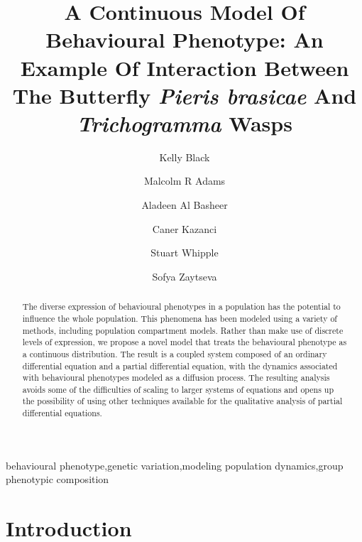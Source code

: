\documentclass[review,authoryear]{elsarticle}
\begin{document}
\begin{frontmatter}

\title{A Continuous Model Of Behavioural Phenotype: An Example Of
  Interaction Between The Butterfly \textit{Pieris brasicae} And
  \textit{Trichogramma} Wasps}

\author[math]{Kelly Black}\author[math]{Malcolm R Adams}\author[math]{Aladeen Al Basheer}\author[math,engineering]{Caner Kazanci}\author[odum]{Stuart Whipple}\author[math]{Sofya Zaytseva}

\address[math]{Department of Mathematics, University of Georgia, Athens, GA 30602, USA}
\address[engineering]{College of Engineering, University of Georgia, Athens, GA 30602, USA}
\address[odum]{Odum School of Ecology and College of Engineering, University of Georgia, Athens, GA 30602, USA}



\begin{abstract}
The diverse expression of behavioural phenotypes in a population has the potential to influence the whole population. This phenomena has been modeled using a variety of methods, including population compartment models. Rather than make use of discrete levels of expression, we propose a novel model that treats the behavioural phenotype as a continuous distribution. The result is a coupled system composed of an ordinary differential equation and a partial differential equation, with the dynamics associated with behavioural phenotypes modeled as a diffusion process. The resulting analysis avoids some of the difficulties of scaling to larger systems of equations and opens up the possibility of using  other techniques available for the qualitative analysis of partial differential equations. 

\end{abstract}

\begin{keyword}
behavioural phenotype\sep genetic variation\sep modeling population dynamics\sep group phenotypic composition
\end{keyword}
\end{frontmatter}
\linenumbers

\section{Introduction}
\end{document}
